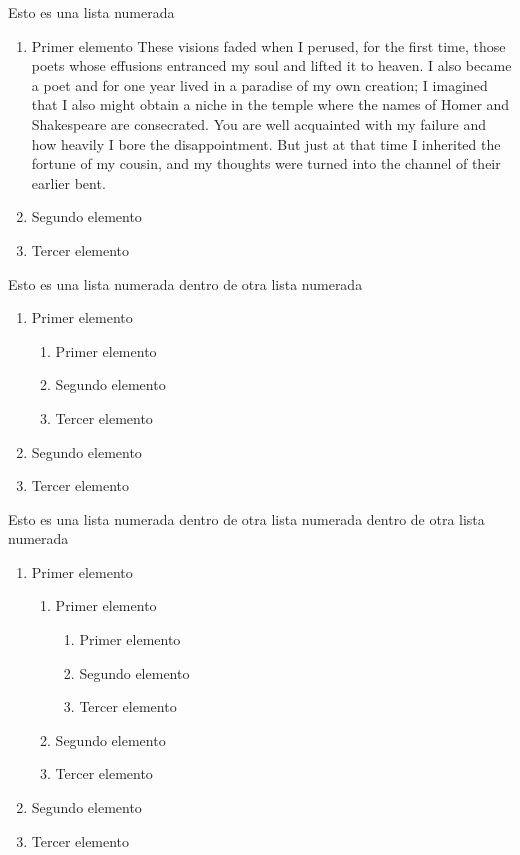 \documentclass{article}
\begin{document}
Esto es una lista numerada

\begin{enumerate}
    \item Primer elemento 
    These visions faded when I perused, for the first time, those poets
whose effusions entranced my soul and lifted it to heaven.  I also
became a poet and for one year lived in a paradise of my own creation;
I imagined that I also might obtain a niche in the temple where the
names of Homer and Shakespeare are consecrated.  You are well
acquainted with my failure and how heavily I bore the disappointment.
But just at that time I inherited the fortune of my cousin, and my
thoughts were turned into the channel of their earlier bent.
    \item Segundo elemento
    \item Tercer elemento
\end{enumerate}

Esto es una lista numerada dentro de otra lista numerada

\begin{enumerate}
    \item Primer elemento 
    \begin{enumerate}
        \item Primer elemento 
        \item Segundo elemento
        \item Tercer elemento
    \end{enumerate}
    \item Segundo elemento
    \item Tercer elemento
\end{enumerate}

Esto es una lista numerada dentro de otra lista numerada dentro de otra lista numerada

\begin{enumerate}
    \item Primer elemento 
    \begin{enumerate}
        \item Primer elemento 
        \begin{enumerate}
            \item Primer elemento 
            \item Segundo elemento
            \item Tercer elemento
        \end{enumerate}
        \item Segundo elemento
        \item Tercer elemento
    \end{enumerate}
    \item Segundo elemento
    \item Tercer elemento
\end{enumerate}
\end{document}
